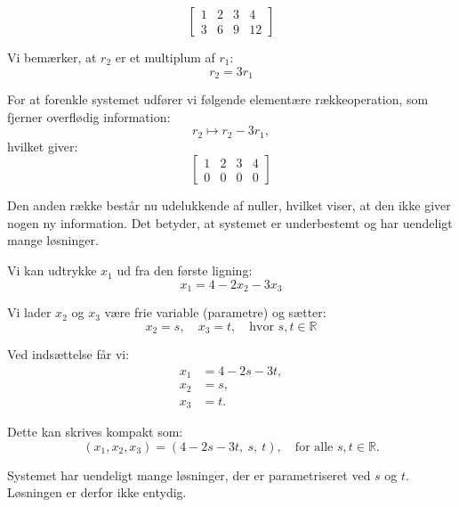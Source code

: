 \begin{solution}
        \[
        \left[\begin{array}{cccc}
        1 & 2 & 3 & 4 \\
        3 & 6 & 9 & 12
        \end{array}\right]
        \]
        
        Vi bemærker, at $r_2$ er et multiplum af $r_1$:
        \[
        r_2 = 3r_1
        \]
        
        For at forenkle systemet udfører vi følgende elementære rækkeoperation, som fjerner overflødig information:
        \[
        r_2 \mapsto r_2 - 3r_1,
        \]
        hvilket giver:
        \[
        \left[\begin{array}{cccc}
        1 & 2 & 3 & 4 \\
        0 & 0 & 0 & 0
        \end{array}\right]
        \]
        
        Den anden række består nu udelukkende af nuller, hvilket viser, at den ikke giver nogen ny information. Det betyder, at systemet er underbestemt og har uendeligt mange løsninger.
        
        Vi kan udtrykke $x_1$ ud fra den første ligning:
        \[
        x_1 = 4 - 2x_2 - 3x_3
        \]
        
        Vi lader $x_2$ og $x_3$ være frie variable (parametre) og sætter:
        \[
        x_2 = s, \quad x_3 = t, \quad \text{hvor } s, t \in \mathbb{R}
        \]
        
        Ved indsættelse får vi:
        \[
        \begin{aligned}
        x_1 &= 4 - 2s - 3t, \\
        x_2 &= s, \\
        x_3 &= t.
        \end{aligned}
        \]
        
        Dette kan skrives kompakt som:
        \[
        (x_1, x_2, x_3) = (4 - 2s - 3t, \ s, \ t), \quad \text{for alle } s, t \in \mathbb{R}.
        \]
        
        Systemet har uendeligt mange løsninger, der er parametriseret ved $s$ og $t$. Løsningen er derfor ikke entydig.\end{solution}

